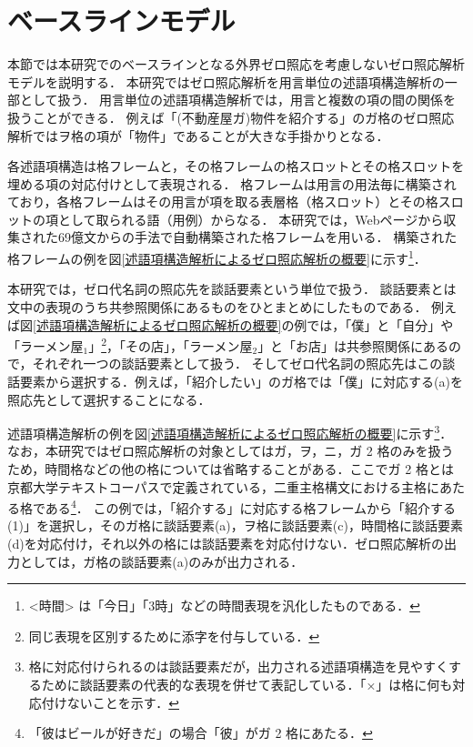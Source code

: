 \documentclass[japanese]{jnlp_1.4}
\begin{document}
\section{ベースラインモデル}
\label{114838_18Jun13}

本節では本研究でのベースラインとなる外界ゼロ照応を考慮しないゼロ照応解析モデルを説明する．
本研究ではゼロ照応解析を用言単位の述語項構造解析の一部として扱う．
用言単位の述語項構造解析では，用言と複数の項の間の関係を扱うことができる．
例えば「(不動産屋ガ)物件を紹介する」のガ格のゼロ照応解析ではヲ格の項が「物件」であることが大きな手掛かりとなる．

各述語項構造は格フレームと，その格フレームの格スロットとその格スロットを埋める項の対応付けとして表現される．
格フレームは用言の用法毎に構築されており，各格フレームはその用言が項を取る表層格（格スロット）とその格スロットの項として取られる語（用例）からなる．
本研究では，Webページから収集された69億文から\cite{kawahara-kurohashi:2006:HLT-NAACL06-Main}の手法で自動構築された格フレームを用いる．
構築された格フレームの例を図\ref{述語項構造解析によるゼロ照応解析の概要}に示す\footnote{{\textless}時間{\textgreater} は「今日」「3時」などの時間表現を汎化したものである．}．

本研究では，ゼロ代名詞の照応先を談話要素という単位で扱う．
談話要素とは文中の表現のうち共参照関係にあるものをひとまとめにしたものである．
例えば図\ref{述語項構造解析によるゼロ照応解析の概要}の例では，「僕」と「自分」や「ラーメン屋$_1$」\footnote{同じ表現を区別するために添字を付与している．}，「その店」，「ラーメン屋$_2$」と「お店」は共参照関係にあるので，それぞれ一つの談話要素として扱う．
そしてゼロ代名詞の照応先はこの談話要素から選択する．例えば，「紹介したい」のガ格では「僕」に対応する(a)を照応先として選択することになる．

述語項構造解析の例を図\ref{述語項構造解析によるゼロ照応解析の概要}に示す\footnote{格に対応付けられるのは談話要素だが，出力される述語項構造を見やすくするために談話要素の代表的な表現を併せて表記している．「×」は格に何も対応付けないことを示す．
}．
なお，本研究ではゼロ照応解析の対象としてはガ，ヲ，ニ，ガ 2 格のみを扱うため，時間格などの他の格については省略することがある．ここでガ 2 格とは京都大学テキストコーパスで定義されている，二重主格構文における主格にあたる格である\footnote{「彼はビールが好きだ」の場合「彼」がガ 2 格にあたる．}．
この例では，「紹介する」に対応する格フレームから「紹介する(1)」を選択し，そのガ格に談話要素(a)，ヲ格に談話要素(c)，時間格に談話要素(d)を対応付け，それ以外の格には談話要素を対応付けない．ゼロ照応解析の出力としては，ガ格の談話要素(a)のみが出力される．
\end{document}
